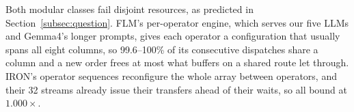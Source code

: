 Both modular classes fail disjoint resources, as predicted in Section~\ref{subsec:question}.
FLM's per-operator engine, which serves our five LLMs and Gemma4's longer prompts, gives each operator a configuration that usually spans all eight columns, so 99.6--100\% of its consecutive dispatches share a column and a new order frees at most what buffers on a shared route let through.
IRON's operator sequences reconfigure the whole array between operators, and their 32 streams already issue their transfers ahead of their waits, so all bound at $1.000\times$.
